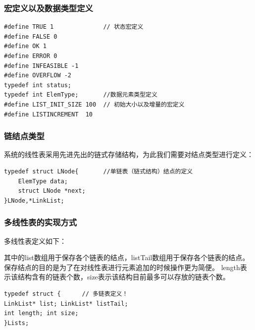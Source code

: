 \documentclass[supercite]{Experimental_Report}
\theoremstyle{definition}
\begin{document}
\subsubsection{宏定义以及数据类型定义}
\begin{verbatim}
#define TRUE 1              // 状态宏定义 
#define FALSE 0
#define OK 1
#define ERROR 0
#define INFEASIBLE -1
#define OVERFLOW -2
typedef int status;
typedef int ElemType;       //数据元素类型定义
#define LIST_INIT_SIZE 100  // 初始大小以及增量的宏定义
#define LISTINCREMENT  10
\end{verbatim}

\subsubsection{链结点类型}
系统的线性表采用先进先出的链式存储结构，为此我们需要对结点类型进行定义：
\begin{verbatim}
typedef struct LNode{       //单链表（链式结构）结点的定义
    ElemType data;
    struct LNode *next;
}LNode,*LinkList;
\end{verbatim}

\subsubsection{多线性表的实现方式}
多线性表定义如下：

其中的list数组用于保存各个链表的结点，listTail数组用于保存各个链表的结点。保存结点的目的是为了在对线性表进行元素追加的时候操作更为简便。
length表示该结构含有的链表个数，size表示该结构目前最多可以存放的链表个数。
\begin{verbatim}
typedef struct {      // 多链表定义！  
LinkList* list; LinkList* listTail;
int length; int size;
}Lists;
\end{verbatim}
\end{document}
